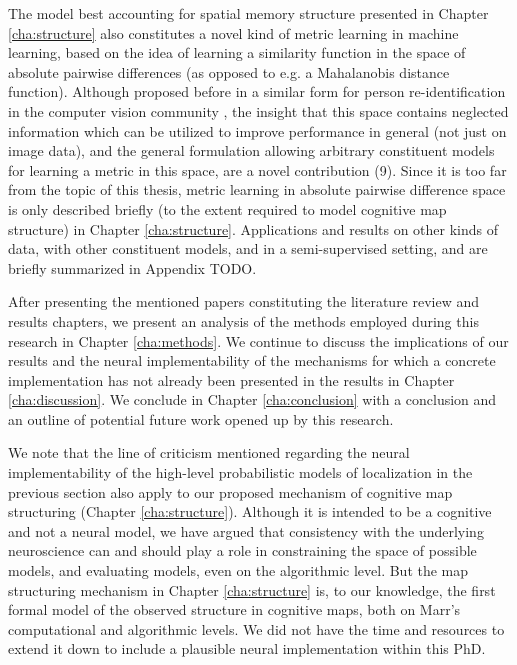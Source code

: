 The model best accounting for spatial memory structure presented in Chapter \ref{cha:structure} also constitutes a novel kind of metric learning in machine learning, based on the idea of learning a similarity function in the space of absolute pairwise differences (as opposed to e.g. a Mahalanobis distance function). Although proposed before in a similar form for person re-identification in the computer vision community \citep{zheng2011person}, the insight that this space contains neglected information which can be utilized to improve performance in general (not just on image data), and the general formulation allowing arbitrary constituent models for learning a metric in this space, are a novel contribution (9). Since it is too far from the topic of this thesis, metric learning in absolute pairwise difference space is only described briefly (to the extent required to model cognitive map structure) in Chapter \ref{cha:structure}. Applications and results on other kinds of data, with other constituent models, and in a semi-supervised setting, and are briefly summarized in Appendix TODO.

After presenting the mentioned papers constituting the literature review and results chapters, we present an analysis of the methods employed during this research in Chapter \ref{cha:methods}. We continue to discuss the implications of our results and the neural implementability of the mechanisms for which a concrete implementation has not already been presented in the results in Chapter \ref{cha:discussion}. We conclude in Chapter \ref{cha:conclusion} with a conclusion and an outline of potential future work opened up by this research. 

We note that the line of criticism mentioned regarding the neural implementability of the high-level probabilistic models of localization in the previous section also apply to our proposed mechanism of cognitive map structuring (Chapter \ref{cha:structure}). Although it is intended to be a cognitive and not a neural model, we have argued that consistency with the underlying neuroscience can and should play a role in constraining the space of possible models, and evaluating models, even on the algorithmic level. But the map structuring mechanism in Chapter \ref{cha:structure} is, to our knowledge, the first formal model of the observed structure in cognitive maps, both on Marr's computational and algorithmic levels. We did not have the time and resources to extend it down to include a plausible neural implementation within this PhD.

